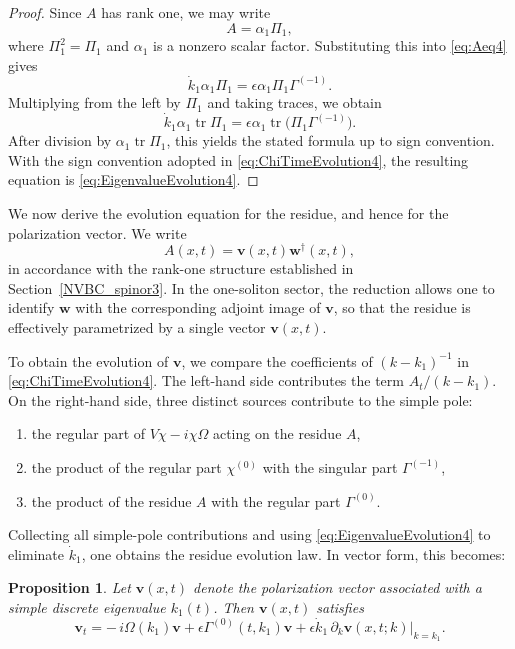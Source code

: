 \documentclass[11pt]{amsart}
\newtheorem{proposition}{Proposition}[section]
\theoremstyle{definition}
\numberwithin{equation}{section}
\begin{document}
\begin{proof}
Since $A$ has rank one, we may write
\[
A=\alpha_1 \Pi_1,
\]
where $\Pi_1^2=\Pi_1$ and $\alpha_1$ is a nonzero scalar factor. Substituting this into \eqref{eq:Aeq4} gives
\[
\dot{k}_1 \alpha_1 \Pi_1 = \epsilon \alpha_1 \Pi_1 \Gamma^{(-1)}.
\]
Multiplying from the left by $\Pi_1$ and taking traces, we obtain
\[
\dot{k}_1 \alpha_1 \operatorname{tr}\Pi_1
=
\epsilon \alpha_1 \operatorname{tr}\bigl(\Pi_1 \Gamma^{(-1)}\bigr).
\]
After division by $\alpha_1 \operatorname{tr}\Pi_1$, this yields the stated formula up to sign convention. With the sign convention adopted in \eqref{eq:ChiTimeEvolution4}, the resulting equation is \eqref{eq:EigenvalueEvolution4}.
\end{proof}

We now derive the evolution equation for the residue, and hence for the polarization vector. We write
\begin{equation}
A(x,t)=\mathbf{v}(x,t)\mathbf{w}^\dagger(x,t),
\label{eq:ADecomposition4}
\end{equation}
in accordance with the rank-one structure established in Section~\ref{NVBC_spinor3}. In the one-soliton sector, the reduction allows one to identify $\mathbf{w}$ with the corresponding adjoint image of $\mathbf{v}$, so that the residue is effectively parametrized by a single vector $\mathbf{v}(x,t)$.

To obtain the evolution of $\mathbf{v}$, we compare the coefficients of $(k-k_1)^{-1}$ in \eqref{eq:ChiTimeEvolution4}. The left-hand side contributes the term $A_t/(k-k_1)$. On the right-hand side, three distinct sources contribute to the simple pole:

\begin{enumerate}
\item the regular part of $V\chi - i\chi\Omega$ acting on the residue $A$,
\item the product of the regular part $\chi^{(0)}$ with the singular part $\Gamma^{(-1)}$,
\item the product of the residue $A$ with the regular part $\Gamma^{(0)}$.
\end{enumerate}

Collecting all simple-pole contributions and using \eqref{eq:EigenvalueEvolution4} to eliminate $\dot{k}_1$, one obtains the residue evolution law. In vector form, this becomes:

\begin{proposition}
Let $\mathbf{v}(x,t)$ denote the polarization vector associated with a simple discrete eigenvalue $k_1(t)$. Then $\mathbf{v}(x,t)$ satisfies
\begin{equation}
\mathbf{v}_t = -\,i\Omega(k_1)\mathbf{v} + \epsilon \Gamma^{(0)}(t,k_1)\mathbf{v}
+ \epsilon \dot{k}_1 \,\partial_k \mathbf{v}(x,t;k)\big|_{k=k_1}.
\label{eq:PolarizationEvolution4}
\end{equation}
\end{proposition}
\end{document}
